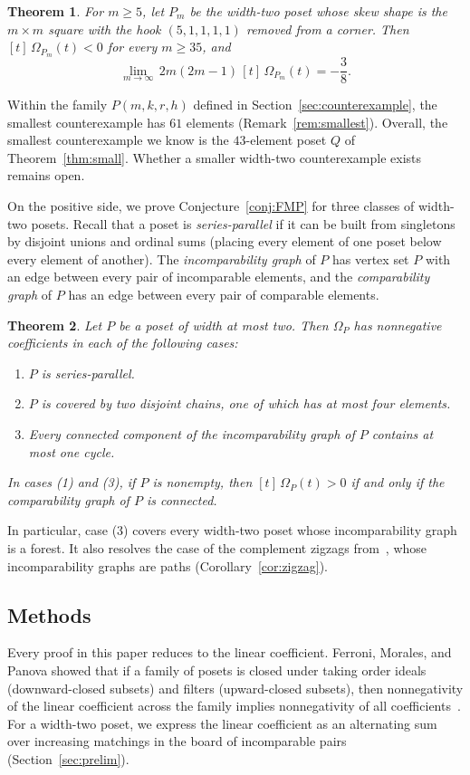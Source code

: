 \documentclass[11pt]{amsart}
\newtheorem{theorem}{Theorem}[section]
\theoremstyle{remark}
\numberwithin{equation}{section}
\begin{document}
\begin{theorem}\label{thm:family}
For $m\ge5$, let $P_m$ be the width-two poset whose skew shape is the
$m\times m$ square with the hook $(5,1,1,1,1)$ removed from a corner. Then
$[t]\,\Omega_{P_m}(t)<0$ for every $m\ge35$, and
\[
 \lim_{m\to\infty}\,2m(2m-1)\,[t]\,\Omega_{P_m}(t)=-\frac38.
\]
\end{theorem}

Within the family $P(m,k,r,h)$ defined in Section~\ref{sec:counterexample}, the
smallest counterexample has $61$ elements (Remark~\ref{rem:smallest}). Overall,
the smallest counterexample we know is the $43$-element poset $Q$ of
Theorem~\ref{thm:small}. Whether a smaller width-two counterexample exists
remains open.

On the positive side, we prove Conjecture~\ref{conj:FMP} for three classes of
width-two posets. Recall that a poset is \emph{series-parallel} if it can be
built from singletons by disjoint unions and ordinal sums (placing every
element of one poset below every element of another). The
\emph{incomparability graph} of $P$ has vertex set $P$ with an edge between
every pair of incomparable elements, and the \emph{comparability graph} of $P$
has an edge between every pair of comparable elements.

\begin{theorem}\label{thm:positive}
Let $P$ be a poset of width at most two. Then $\Omega_P$ has nonnegative
coefficients in each of the following cases:
\begin{enumerate}
 \item $P$ is series-parallel.
 \item $P$ is covered by two disjoint chains, one of which has at most four
 elements.
 \item Every connected component of the incomparability graph of $P$ contains at
 most one cycle.
\end{enumerate}
In cases (1) and (3), if $P$ is nonempty, then $[t]\,\Omega_P(t)>0$ if and only
if the comparability graph of $P$ is connected.
\end{theorem}

In particular, case (3) covers every width-two poset whose incomparability
graph is a forest. It also resolves the case of the complement zigzags
from~\cite[Remark~7.3]{FMP}, whose incomparability graphs are paths
(Corollary~\ref{cor:zigzag}).

\subsection*{Methods}
Every proof in this paper reduces to the linear coefficient. Ferroni, Morales,
and Panova showed that if a family of posets is closed under taking order
ideals (downward-closed subsets) and filters (upward-closed subsets), then
nonnegativity of the linear coefficient across the family implies nonnegativity
of all coefficients~\cite[Theorem~3.4]{FMP}. For a width-two poset, we express
the linear coefficient as an alternating sum over increasing matchings in the
board of incomparable pairs (Section~\ref{sec:prelim}).
\end{document}
